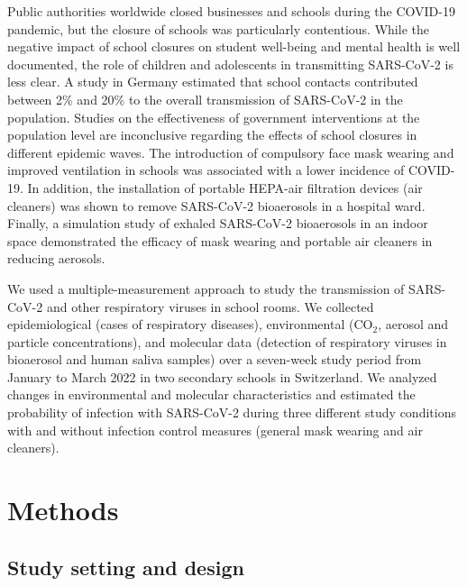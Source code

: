\documentclass[fleqn,11pt]{wlscirep}
\begin{document}
Public authorities worldwide closed businesses and schools during the COVID-19 pandemic\cite{Banholzer2022EJE,Banholzer2021PLOS}, but the closure of schools was particularly contentious. While the negative impact of school closures on student well-being and mental health is well documented\cite{Loades2020}, the role of children and adolescents in transmitting SARS-CoV-2 is less clear\cite{Goldstein2021}. A study in Germany estimated that school contacts contributed between 2\% and 20\% to the overall transmission of SARS-CoV-2 in the population\cite{Heinsohn2022}. Studies on the effectiveness of government interventions at the population level are inconclusive regarding the effects of school closures in different epidemic waves\cite{Banholzer2021PLOS,Sharma2021}. The introduction of compulsory face mask wearing\cite{Gettings2021,Heinsohn2022} and improved ventilation\cite{Gettings2021} in schools was associated with a lower incidence of COVID-19. In addition, the installation of portable HEPA-air filtration devices (air cleaners) was shown to remove SARS-CoV-2 bioaerosols in a hospital ward\cite{Morris2022}. Finally, a simulation study of exhaled SARS-CoV-2 bioaerosols in an indoor space demonstrated the efficacy of mask wearing and portable air cleaners in reducing aerosols\cite{Lindsley2021}. 

We used a multiple-measurement approach to study the transmission of SARS-CoV-2 and other respiratory viruses in school rooms. We collected epidemiological (cases of respiratory diseases), environmental (CO$_2$, aerosol and particle concentrations), and molecular data (detection of respiratory viruses in bioaerosol and human saliva samples) over a seven-week study period from January to March 2022 in two secondary schools in Switzerland.  We analyzed changes in environmental and molecular characteristics and estimated the probability of infection with SARS-CoV-2 during three different study conditions with and without infection control measures (general mask wearing and air cleaners).

\newpage

\section{Methods}

\subsection{Study setting and design} 
\end{document}

